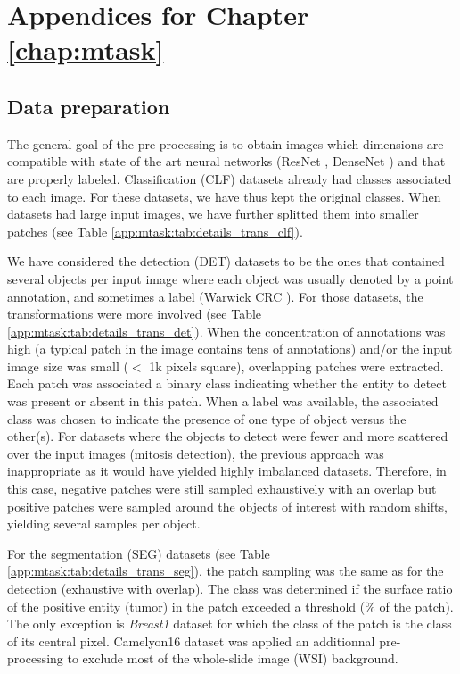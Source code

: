 \chapter{Appendices for Chapter \ref{chap:mtask}}
\label{app:mtask}

\section{Data preparation}
\label{app:mtask:sec:datasets}

The general goal of the pre-processing is to obtain images which dimensions are compatible with state of the art neural networks (\eg ResNet \parencite{he2016deep}, DenseNet \parencite{huang2017densely}) and that are properly labeled. Classification (CLF) datasets already had classes associated to each image. For these datasets, we have thus kept the original classes. When datasets had large input images, we have further splitted them into smaller patches (see Table \ref{app:mtask:tab:details_trans_clf}).

We have considered the detection (DET) datasets to be the ones that contained several objects per input image where each object was usually denoted by a point annotation, and sometimes a label (\eg Warwick CRC \parencite{sirinukunwattana2016locality}). For those datasets, the transformations were more involved (see Table \ref{app:mtask:tab:details_trans_det}). When the concentration of annotations was high (\ie a typical patch in the image contains tens of annotations) and/or the input image size was small (\ie $<$ 1k pixels square), overlapping patches were extracted. Each patch was associated a binary class indicating whether the entity to detect was present or absent in this patch. When a label was available, the associated class was chosen to indicate the presence of one type of object versus the other(s). For datasets where the objects to detect were fewer and more scattered over the input images (\eg mitosis detection), the previous approach was inappropriate as it would have yielded highly imbalanced datasets. Therefore, in this case, negative patches were still sampled exhaustively with an overlap but positive patches were sampled around the objects of interest with random shifts, yielding several samples per object. 

For the segmentation (SEG) datasets (see Table \ref{app:mtask:tab:details_trans_seg}), the patch sampling was the same as for the detection (\ie exhaustive with overlap). The class was determined if the surface ratio of the positive entity (\eg tumor) in the patch exceeded a threshold (\% of the patch). The only exception is \textit{Breast1} dataset for which the class of the patch is the class of its central pixel. Camelyon16 \parencite{bejnordi2017diagnostic} dataset was applied an additionnal pre-processing to exclude most of the whole-slide image (WSI) background.

